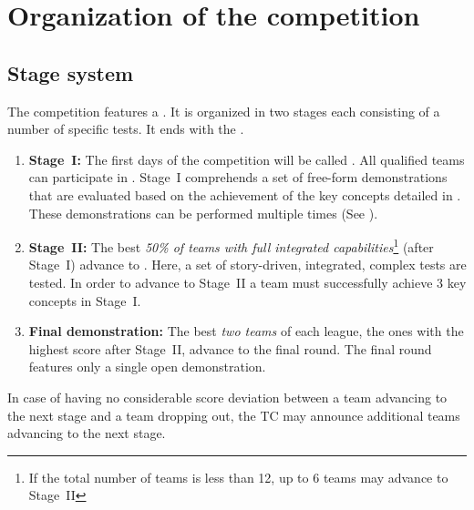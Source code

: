 \section{Organization of the competition}
\label{sec:procedure_during_competition}

\subsection{Stage system}\label{rule:stages}

The competition features a . It is organized in two stages each consisting of a number of specific tests. It ends with the .

\begin{enumerate}
	\item \textbf{Stage~I:} The first days of the competition will be called . 
	All qualified teams can participate in . Stage~I comprehends a set of free-form demonstrations that are evaluated based on the achievement of the key concepts detailed in . These demonstrations can be performed multiple times (See ). 

	\item \textbf{Stage~II:} The best \emph{50\% of teams with full integrated capabilities}\footnote{If the total number of teams is less than 12, up to 6 teams may advance to Stage~II} (after Stage~I) advance to . Here, a set of story-driven, integrated, complex tests are tested. In order to advance to Stage~II a team must successfully achieve 3 key concepts in Stage~I. \\
	\item \textbf{Final demonstration:} The best \emph{two teams} of each league, the ones with the highest score after Stage~II, advance to the final round. The final round features only a single open demonstration.
\end{enumerate}

In case of having no considerable score deviation between a team advancing to the next stage and a team dropping out, the TC may announce additional teams advancing to the next stage.


